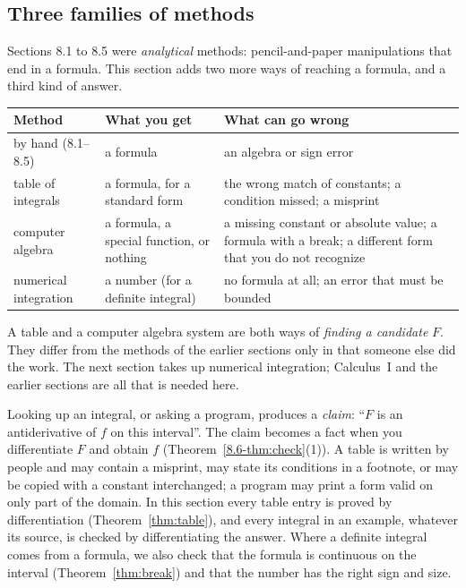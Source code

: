 \documentclass[11pt]{article}
\begin{document}
\subsection*{Three families of methods}

Sections 8.1 to 8.5 were \emph{analytical} methods: pencil-and-paper manipulations that end in a formula. This section adds two more ways of reaching a formula, and a third kind of answer.

\begin{center}
\renewcommand{\arraystretch}{1.3}
\begin{tabular}{p{1.25in}p{1.55in}p{2.1in}}
\textbf{Method} & \textbf{What you get} & \textbf{What can go wrong}\\ \hline
by hand (8.1--8.5) & a formula & an algebra or sign error\\
table of integrals & a formula, for a standard form & the wrong match of constants; a condition missed; a misprint\\
computer algebra & a formula, a special function, or nothing & a missing constant or absolute value; a formula with a break; a different form that you do not recognize\\
numerical integration & a number (for a definite integral) & no formula at all; an error that must be bounded\\
\end{tabular}
\end{center}

A table and a computer algebra system are both ways of \emph{finding a candidate} $F$. They differ from the methods of the earlier sections only in that someone else did the work. The next section takes up numerical integration; Calculus~I and the earlier sections are all that is needed here.

\begin{warn}
Looking up an integral, or asking a program, produces a \emph{claim}: ``$F$ is an antiderivative of $f$ on this interval''. The claim becomes a fact when you differentiate $F$ and obtain $f$ (Theorem~\ref{8.6-thm:check}(1)). A table is written by people and may contain a misprint, may state its conditions in a footnote, or may be copied with a constant interchanged; a program may print a form valid on only part of the domain. In this section every table entry is proved by differentiation (Theorem~\ref{thm:table}), and every integral in an example, whatever its source, is checked by differentiating the answer. Where a definite integral comes from a formula, we also check that the formula is continuous on the interval (Theorem~\ref{thm:break}) and that the number has the right sign and size.
\end{warn}
\end{document}
